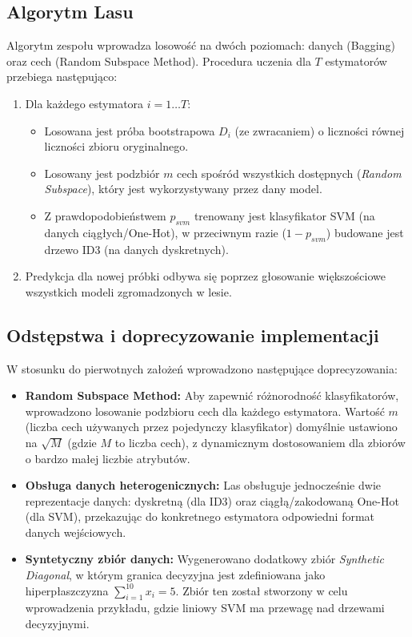 \documentclass[a4paper,11pt]{article}
\begin{document}
\subsection{Algorytm Lasu}
Algorytm zespołu wprowadza losowość na dwóch poziomach: danych (Bagging) oraz cech (Random Subspace Method). Procedura uczenia dla $T$ estymatorów przebiega następująco:
\begin{enumerate}
    \item Dla każdego estymatora $i=1 \dots T$:
    \begin{itemize}
        \item Losowana jest próba bootstrapowa $D_i$ (ze zwracaniem) o liczności równej liczności zbioru oryginalnego.
        \item Losowany jest podzbiór $m$ cech spośród wszystkich dostępnych (\textit{Random Subspace}), który jest wykorzystywany przez dany model.
        \item Z prawdopodobieństwem $p_{svm}$ trenowany jest klasyfikator SVM (na danych ciągłych/One-Hot), w przeciwnym razie ($1-p_{svm}$) budowane jest drzewo ID3 (na danych dyskretnych).
    \end{itemize}
    \item Predykcja dla nowej próbki odbywa się poprzez głosowanie większościowe wszystkich modeli zgromadzonych w lesie.
\end{enumerate}

\subsection{Odstępstwa i doprecyzowanie implementacji}
W stosunku do pierwotnych założeń wprowadzono następujące doprecyzowania:
\begin{itemize}
    \item \textbf{Random Subspace Method:} Aby zapewnić różnorodność klasyfikatorów, wprowadzono losowanie podzbioru cech dla każdego estymatora. Wartość $m$ (liczba cech używanych przez pojedynczy klasyfikator) domyślnie ustawiono na $\sqrt{M}$ (gdzie $M$ to liczba cech), z dynamicznym dostosowaniem dla zbiorów o bardzo małej liczbie atrybutów.
    \item \textbf{Obsługa danych heterogenicznych:} Las obsługuje jednocześnie dwie reprezentacje danych: dyskretną (dla ID3) oraz ciągłą/zakodowaną One-Hot (dla SVM), przekazując do konkretnego estymatora odpowiedni format danych wejściowych.
    \item \textbf{Syntetyczny zbiór danych:} Wygenerowano dodatkowy zbiór \textit{Synthetic Diagonal}, w którym granica decyzyjna jest zdefiniowana jako hiperpłaszczyzna $\sum_{i=1}^{10} x_i = 5$. Zbiór ten został stworzony w celu wprowadzenia przykładu, gdzie liniowy SVM ma przewagę nad drzewami decyzyjnymi.
\end{itemize}
\end{document}
